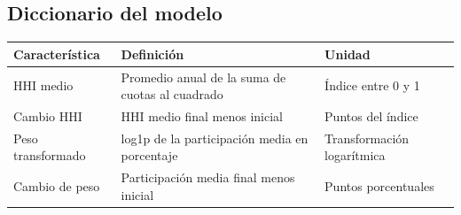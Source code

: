 \documentclass[
  spanish,
  10pt,
]{article}
\newcounter{none} %
\begin{document}
\subsection{Diccionario del modelo}\label{diccionario-del-modelo}

{\def\LTcaptype{none} %
\begin{longtable}[]{@{}
  >{\raggedright\arraybackslash}p{}
  >{\raggedright\arraybackslash}p{}
  >{\raggedright\arraybackslash}p{}@{}}
\toprule\noalign{}
\begin{minipage}[b]{\linewidth}\raggedright
Característica
\end{minipage} & \begin{minipage}[b]{\linewidth}\raggedright
Definición
\end{minipage} & \begin{minipage}[b]{\linewidth}\raggedright
Unidad
\end{minipage} \\
\midrule\noalign{}
\endhead
\bottomrule\noalign{}
\endlastfoot
HHI medio & Promedio anual de la suma de cuotas al cuadrado & Índice
entre 0 y 1 \\
Cambio HHI & HHI medio final menos inicial & Puntos del índice \\
Peso transformado & log1p de la participación media en porcentaje &
Transformación logarítmica \\
Cambio de peso & Participación media final menos inicial & Puntos
porcentuales \\
\end{longtable}
}
\end{document}
